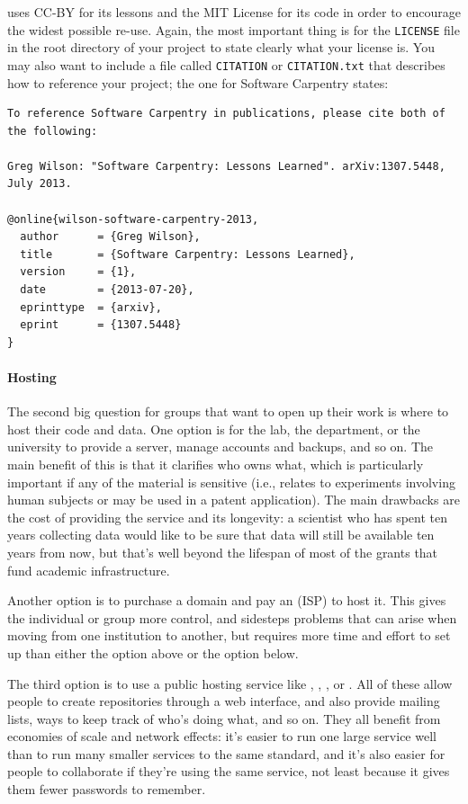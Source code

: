 \documentclass{book}
\begin{document}
uses CC-BY for its lessons and the MIT License for its code in order to
encourage the widest possible re-use. Again, the most important thing is
for the \texttt{LICENSE} file in the root directory of your project to
state clearly what your license is. You may also want to include a file
called \texttt{CITATION} or \texttt{CITATION.txt} that describes how to
reference your project; the one for Software Carpentry states:

\begin{verbatim}
To reference Software Carpentry in publications, please cite both of the following:

Greg Wilson: "Software Carpentry: Lessons Learned". arXiv:1307.5448, July 2013.

@online{wilson-software-carpentry-2013,
  author      = {Greg Wilson},
  title       = {Software Carpentry: Lessons Learned},
  version     = {1},
  date        = {2013-07-20},
  eprinttype  = {arxiv},
  eprint      = {1307.5448}
}
\end{verbatim}

\mbox{}\paragraph{Hosting}

The second big question for groups that want to open up their work is
where to host their code and data. One option is for the lab, the
department, or the university to provide a server, manage accounts and
backups, and so on. The main benefit of this is that it clarifies who
owns what, which is particularly important if any of the material is
sensitive (i.e., relates to experiments involving human subjects or may
be used in a patent application). The main drawbacks are the cost of
providing the service and its longevity: a scientist who has spent ten
years collecting data would like to be sure that data will still be
available ten years from now, but that's well beyond the lifespan of
most of the grants that fund academic infrastructure.

Another option is to purchase a domain and pay an
 (ISP) to host it. This gives
the individual or group more control, and sidesteps problems that can
arise when moving from one institution to another, but requires more
time and effort to set up than either the option above or the option
below.

The third option is to use a public hosting service like
,
,
, or
. All of these allow people to
create repositories through a web interface, and also provide mailing
lists, ways to keep track of who's doing what, and so on. They all
benefit from economies of scale and network effects: it's easier to run
one large service well than to run many smaller services to the same
standard, and it's also easier for people to collaborate if they're
using the same service, not least because it gives them fewer passwords
to remember.
\end{document}
